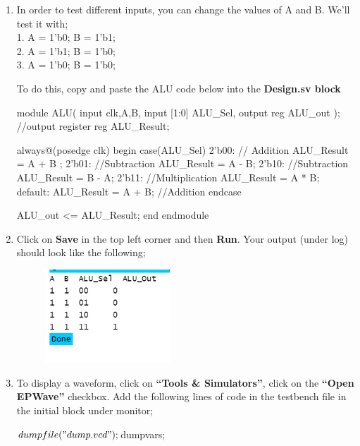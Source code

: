 \begin{enumerate}
    \item In order to test different inputs, you can change the values of A and B. We'll test it with; \\
    1. A = 1'b0; B = 1'b1; \\
    2. A = 1'b1; B = 1'b0; \\
    3. A = 1'b0; B = 1'b0; 
    
   To do this, copy and paste the ALU code below into the \textbf{Design.sv block}
    
    \begin{Verilog}
   module ALU(
    input clk,A,B,
  	input [1:0] ALU_Sel,
    output reg ALU_out
);
  //output register
  reg ALU_Result;
    
  always@(posedge clk)
    begin
     case(ALU_Sel)
        2'b00: // Addition
           ALU_Result = A + B ; 
        2'b01: //Subtraction 
           ALU_Result = A - B;
        2'b10: //Subtraction
           ALU_Result = B - A;
        2'b11: //Multiplication
           ALU_Result = A * B;
        default: ALU_Result = A + B; //Addition
     endcase
    
     ALU_out <= ALU_Result;
    end
endmodule


    \end{Verilog}
    
    \item Click on \textbf{Save} in the top left corner and then \textbf{Run}.
    Your output (under log) should look like the following;
    \begin{figure}[H]
            \centering
            \includegraphics[width=0.25\columnwidth,height=3.5cm]{Figures/results.PNG}
            \label{fig: results}
        \end{figure}
    \item To display a waveform, click on \textbf{“Tools \& Simulators”}, click on the \textbf{“Open EPWave”} checkbox. Add the following lines of code in the testbench file in the initial block under monitor;
    
    \begin{Verilog}
        $dumpfile("dump.vcd"); 
      	$dumpvars;
    \end{Verilog}
    

\end{enumerate}
